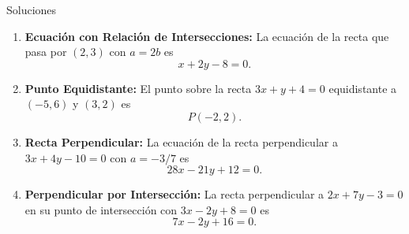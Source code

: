 \documentclass[10pt,aspectratio=169,spanish]{beamer}
\begin{document}
\begin{frame}{Soluciones}
\begin{enumerate}
    \item \textbf{Ecuación con Relación de Intersecciones:} 
    La ecuación de la recta que pasa por $(2,3)$ con $a = 2b$ es
    \[
    \boxed{x + 2y - 8 = 0}.
    \]

    \item \textbf{Punto Equidistante:} 
    El punto sobre la recta $3x + y + 4 = 0$ equidistante a $(-5,6)$ y $(3,2)$ es
    \[
    \boxed{P(-2, 2)}.
    \]

    \item \textbf{Recta Perpendicular:} 
    La ecuación de la recta perpendicular a $3x + 4y - 10 = 0$ con $a = -3/7$ es
    \[
    \boxed{28x - 21y + 12 = 0}.
    \]

    \item \textbf{Perpendicular por Intersección:} 
    La recta perpendicular a $2x + 7y - 3 = 0$ en su punto de intersección con $3x - 2y + 8 = 0$ es
    \[
    \boxed{7x - 2y + 16 = 0}.
    \]
\end{enumerate}
\end{frame}

\end{document}
